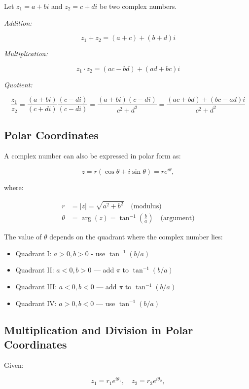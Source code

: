 Let \( z_1 = a + bi \) and \( z_2 = c + di \) be two complex numbers.
\vspace{\baselineskip}

\emph{Addition:}

\[ 
	z_1 + z_2 = (a + c) + (b + d)i
\]

\emph{Multiplication:}
	      
\[
	z_1 \cdot z_2 = (ac - bd) + (ad + bc)i
\]

\emph{Quotient:}
	      
\[
	\frac{z_1}{z_2} = \frac{(a + bi)}{(c + di)} \frac{(c - di)}{(c - di)} = \frac{(a + bi)(c - di)}{c^2 + d^2} = \frac{(ac + bd) + (bc - ad)i}{c^2 + d^2}
\]

\subsection{Polar Coordinates}

A complex number can also be expressed in polar form as:

\[
	z = r(\cos \theta + i \sin \theta) = re^{i\theta},
\]

where:

\begin{align*}
	r      & = |z| = \sqrt{a^2 + b^2} \quad \text{(modulus)}                       \\
	\theta & = \arg(z) = \tan^{-1}\left(\frac{b}{a}\right) \quad \text{(argument)}
\end{align*}

The value of \( \theta \) depends on the quadrant where the complex number lies:

\begin{itemize}
	\item Quadrant I: \( a > 0, b > 0 \) - use \( \tan^{-1}(b/a) \)
	\item Quadrant II: \( a < 0, b > 0 \) — add \( \pi \) to \( \tan^{-1}(b/a) \)
	\item Quadrant III: \( a < 0, b < 0 \) — add \( \pi \) to \( \tan^{-1}(b/a) \)
	\item Quadrant IV: \( a > 0, b < 0 \) — use \( \tan^{-1}(b/a) \)
\end{itemize}

\subsection{Multiplication and Division in Polar Coordinates}

Given:

\[
	z_1 = r_1 e^{i\theta_1}, \quad z_2 = r_2 e^{i\theta_2},
\]

